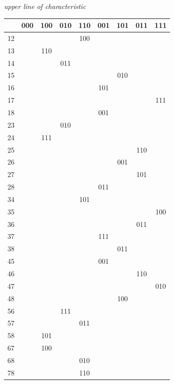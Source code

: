\documentclass[11pt]{article}
\begin{document}
\begin{center}
\textit{upper line of characteristic}\\[2pt]
\begin{tabular}{|c||c|c|c|c|c|c|c|c|}
\hline
    & 000 & 100 & 010 & 110 & 001 & 101 & 011 & 111 \\
\hline\hline
12  &     &     &     & 100 &     &     &     &     \\
\hline
13  &     & 110 &     &     &     &     &     &     \\
\hline
14  &     &     & 011 &     &     &     &     &     \\
\hline
15  &     &     &     &     &     & 010 &     &     \\
\hline
16  &     &     &     &     & 101 &     &     &     \\
\hline
17  &     &     &     &     &     &     &     & 111 \\
\hline
18  &     &     &     &     & 001 &     &     &     \\
\hline
23  &     &     & 010 &     &     &     &     &     \\
\hline
24  &     & 111 &     &     &     &     &     &     \\
\hline
25  &     &     &     &     &     &     & 110 &     \\
\hline
26  &     &     &     &     &     & 001 &     &     \\
\hline
27  &     &     &     &     &     &     & 101 &     \\
\hline
28  &     &     &     &     & 011 &     &     &     \\
\hline
34  &     &     &     & 101 &     &     &     &     \\
\hline
35  &     &     &     &     &     &     &     & 100 \\
\hline
36  &     &     &     &     &     &     & 011 &     \\
\hline
37  &     &     &     &     & 111 &     &     &     \\
\hline
38  &     &     &     &     &     & 011 &     &     \\
\hline
45  &     &     &     &     & 001 &     &     &     \\
\hline
46  &     &     &     &     &     &     & 110 &     \\
\hline
47  &     &     &     &     &     &     &     & 010 \\
\hline
48  &     &     &     &     &     & 100 &     &     \\
\hline
56  &     &     & 111 &     &     &     &     &     \\
\hline
57  &     &     &     & 011 &     &     &     &     \\
\hline
58  &     & 101 &     &     &     &     &     &     \\
\hline
67  &     & 100 &     &     &     &     &     &     \\
\hline
68  &     &     &     & 010 &     &     &     &     \\
\hline
78  &     &     &     & 110 &     &     &     &     \\
\hline
\end{tabular}
\end{center}
\end{document}
